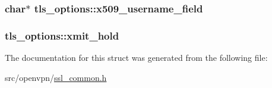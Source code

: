 \subsubsection[{x509\+\_\+username\+\_\+field}]{\setlength{\rightskip}{0pt plus 5cm}char$\ast$ tls\+\_\+options\+::x509\+\_\+username\+\_\+field}\label{structtls__options_a647ce1910e6a305011105ef5209c4969}
\hypertarget{structtls__options_ac267c87257baba5792b12cb984761ded}{}
\subsubsection[{xmit\+\_\+hold}]{ tls\+\_\+options\+::xmit\+\_\+hold}\label{structtls__options_ac267c87257baba5792b12cb984761ded}


The documentation for this struct was generated from the following file\+:\begin{DoxyCompactItemize}
\item 
src/openvpn/\hyperlink{ssl__common_8h}{ssl\+\_\+common.\+h}\end{DoxyCompactItemize}
